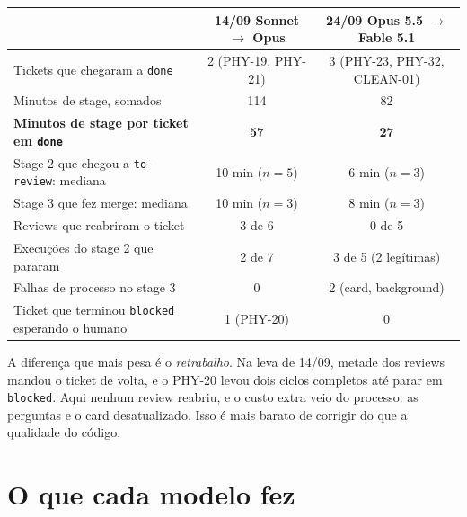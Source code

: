 \documentclass[11pt,a4paper]{article}
\newcommand{\tk}[1]{\texttt{#1}}
\begin{document}
{\small
\begin{tabularx}{\linewidth}{@{}Ycc@{}}
\toprule
 & 14/09 Sonnet $\rightarrow$ Opus & 24/09 Opus 5.5 $\rightarrow$ Fable 5.1 \\
\midrule
Tickets que chegaram a \tk{done} & 2 (PHY-19, PHY-21) & 3 (PHY-23, PHY-32, CLEAN-01) \\
Minutos de stage, somados & 114 & 82 \\
\textbf{Minutos de stage por ticket em \tk{done}} & \textbf{57} & \textbf{27} \\
Stage 2 que chegou a \tk{to-review}: mediana & 10 min ($n=5$) & 6 min ($n=3$) \\
Stage 3 que fez merge: mediana & 10 min ($n=3$) & 8 min ($n=3$) \\
Reviews que reabriram o ticket & 3 de 6 & 0 de 5 \\
Execuções do stage 2 que pararam & 2 de 7 & 3 de 5 (2 legítimas) \\
Falhas de processo no stage 3 & 0 & 2 (card, background) \\
Ticket que terminou \tk{blocked} esperando o humano & 1 (PHY-20) & 0 \\
\bottomrule
\end{tabularx}}

A diferença que mais pesa é o \emph{retrabalho}.
Na leva de 14/09, metade dos reviews mandou o ticket de volta, e o PHY-20 levou dois ciclos completos até parar em \tk{blocked}.
Aqui nenhum review reabriu, e o custo extra veio do processo: as perguntas e o card desatualizado.
Isso é mais barato de corrigir do que a qualidade do código.

\section{O que cada modelo fez}\label{sec:qual}
\end{document}
